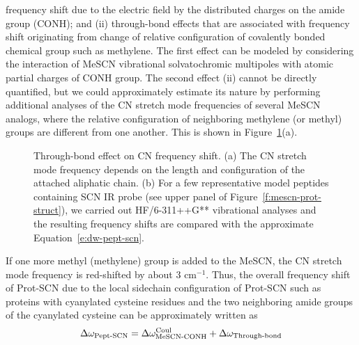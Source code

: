 \documentclass[a4paper,titlepage,twoside,fleqn,12pt]{book}
\begin{document}
\begin{refsection}
frequency shift due to the electric field by the distributed
charges on the amide group (CONH); and (ii) through\hyp{}bond
effects that are associated with frequency shift originating
from change of relative configuration of covalently bonded
chemical group such as methylene. The first effect can be
modeled by considering the interaction of MeSCN
vibrational solvatochromic multipoles with atomic partial
charges of CONH group. The second effect (ii) cannot be
directly quantified, but we could approximately estimate its
nature by performing additional analyses of the CN stretch
mode frequencies of several MeSCN analogs,
where the relative configuration of neighboring methylene (or
methyl) groups are different from one another. 
This is shown in Figure~\ref{f:mescn-prot-through-bond}(a). 
%
\begin{figure}[t!]
\centering
\setlength\fboxsep{0.4pt}
\setlength\fboxrule{0.5pt}
\caption{
Through-bond effect on CN frequency shift. (a) The CN stretch mode frequency depends on the length and
configuration of the attached aliphatic chain. (b) For a few representative model peptides containing SCN IR
probe (see upper panel of Figure~\ref{f:mescn-prot-struct}), 
we carried out HF/6-311++G** vibrational analyses and the resulting frequency shifts are
compared with the approximate Equation~\ref{e:dw-pept-scn}.
\label{f:mescn-prot-through-bond}}
\end{figure}
%
If one more
methyl (methylene) group is added to the MeSCN, the CN
stretch mode frequency is red\hyp{}shifted by about 3 cm$^{-1}$. Thus,
the overall frequency shift of Prot-SCN due to the local sidechain
configuration of Prot-SCN such as proteins with
cyanylated cysteine residues and the two neighboring amide
groups of the cyanylated cysteine can be approximately
written as
%
\begin{equation} \label{e:dw-pept-scn}
 \Delta\omega_{\text{Pept-SCN}} = \Delta\omega_{\text{MeSCN-CONH}}^{\rm Coul} + \Delta\omega_{\text{Through-bond}}

\end{equation}
\end{refsection}
\end{document}
